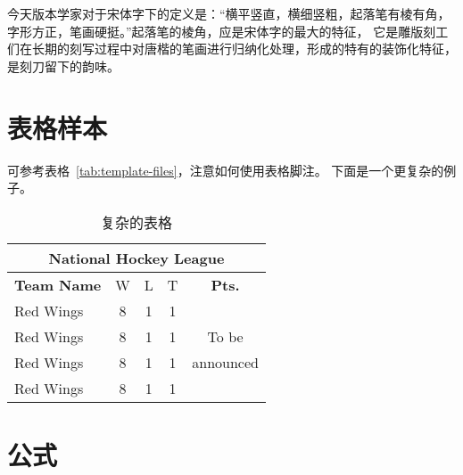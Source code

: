 
{\song
今天版本学家对于宋体字下的定义是：“横平竖直，横细竖粗，起落笔有棱有角，
字形方正，笔画硬挺。”起落笔的棱角，应是宋体字的最大的特征，
它是雕版刻工们在长期的刻写过程中对唐楷的笔画进行归纳化处理，形成的特有的装饰化特征，
是刻刀留下的韵味。}

\section{表格样本}

可参考表格~\ref{tab:template-files}，注意如何使用表格脚注。
下面是一个更复杂的例子。
\begin{table}[htb]
\centering \caption{复杂的表格}\label{tab:tab1}
\begin{tabular}{|l||ccc||c|}\hline
\multicolumn{5}{|c|}{National Hockey League}\\ \hline \hline
\textbf{Team Name} & W & L & T & \textbf{Pts.} \\ \hline Red Wings &
8 & 1 & 1 & \\ \cline{1-4} Red Wings & 8 & 1 & 1 & To be\\
\cline{1-4} Red Wings & 8 & 1 & 1 & announced\\ \cline{1-4} Red
Wings & 8 & 1 & 1 & \\\hline
\end{tabular}
\end{table}

\section{公式}

